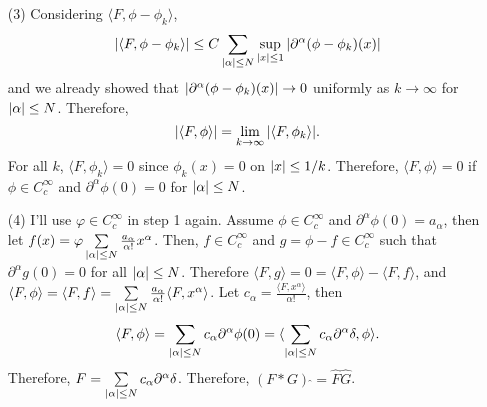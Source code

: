 \documentclass{article}
\begin{document}
\begin{enumerate}
\begin{proof}
pf of hint: The Taylor series of $\phi$ about $0$ would be
\begin{equation*}
\phi(x)=\sum_{\abs{\beta}\leq N+1} \frac{\partial^\beta \phi(0)}{\beta!} x^\beta + r(x)
\end{equation*}
such that $r(x)$ is differentiable and $\lim\limits_{x\rightarrow 0}\frac{r(x)}{\abs{x}^{N+1}}=0$. Since we only interested in $\abs{x}\leq 1$, $\partial^\beta\phi$ is bounded for all $\abs{\beta}\leq N+1$ and and $\frac{r(x)}{x^{N+1}}$ is bounded in $\abs{x}\leq 1$. As $\partial^\beta \phi(0)=0$ for $\abs{\beta}\leq N$, we can get
\begin{equation*}
\abs{\phi(x)}\leq \left(C+\frac{r(x)}{\abs{x}^{N+1}}\right) \abs{x}^{N+1}\leq C' \abs{x}^{N+1}.
\end{equation*}
for some $0<C, C'<\infty$. By the same reason, we can get
\begin{equation*}
\abs{\partial^\alpha \phi(x)}\leq C\abs{x}^{N+1-\abs{\alpha}}
\end{equation*}
for $\abs{\alpha}\leq N$.
\end{proof}
\item[(3)] Considering $\langle F,\phi-\phi_k\rangle$,
\begin{equation*}
\begin{split}
\abs{\langle F,\phi-\phi_k\rangle}\leq C\sum\limits_{\abs{\alpha}\leq N}\sup\limits_{\abs{x}\leq 1}\abs{\partial^\alpha(\phi-\phi_k)(x)}
\end{split}
\end{equation*}
and we already showed that $\abs{\partial^\alpha(\phi-\phi_k)(x)}\rightarrow 0$ uniformly as $k\rightarrow\infty$ for $\abs{\alpha}\leq N$. Therefore,
\begin{equation*}
\abs{\langle F,\phi\rangle}=\lim\limits_{k\rightarrow \infty} \abs{\langle F,\phi_k\rangle}.
\end{equation*}
For all $k$, $\langle F, \phi_k\rangle=0$ since $\phi_k(x)=0$ on $\abs{x}\leq 1/k$. Therefore, $\langle F, \phi \rangle=0$ if $\phi\in C_c^\infty$ and $\partial^\alpha\phi(0)=0$ for $\abs{\alpha}\leq N$.
\item[(4)] I'll use $\varphi\in C_c^\infty$ in step 1 again. Assume $\phi\in C_c^\infty$ and $\partial^\alpha \phi(0)=a_\alpha$, then let $f(x)=\varphi\sum\limits_{\abs{\alpha}\leq N} \frac{a_\alpha}{\alpha!} x^\alpha $. Then, $f\in C_c^\infty$ and $g=\phi-f\in C_c^\infty$ such that $\partial^\alpha g(0)=0$ for all $\abs{\alpha}\leq N$. Therefore $\langle F, g\rangle=0=\langle F, \phi\rangle-\langle F, f\rangle$, and $\langle F, \phi\rangle=\langle F, f\rangle=\sum\limits_{\abs{\alpha}\leq N} \frac{a_\alpha}{\alpha!}\langle F, x^\alpha\rangle$. Let $c_\alpha=\frac{\langle F, x^\alpha\rangle}{\alpha!}$, then
\begin{equation*}
\langle F, \phi\rangle=\sum\limits_{\abs{\alpha}\leq N}c_\alpha \partial^\alpha \phi(0)=\langle \sum\limits_{\abs{\alpha}\leq N} c_\alpha \partial^\alpha \delta, \phi\rangle.
\end{equation*}
Therefore, $F=\sum\limits_{\abs{\alpha}\leq N} c_\alpha \partial^\alpha \delta$. Therefore, $(F*G)\,\widehat{}=\hat{F}\hat{G}$.
\end{enumerate}
\end{document}
